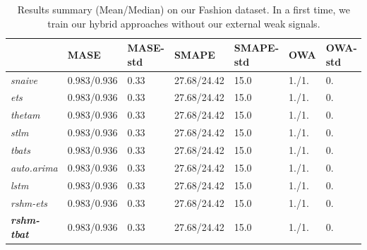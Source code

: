 \documentclass{article} %
\begin{document}
\begin{table}
  \caption{Results summary (Mean/Median) on our Fashion dataset. In a first time, we train our hybrid approaches without our external weak signals.}
  \label{sample-table}
  \centering
  \begin{tabular}{lllllll}
    \hline
    &  MASE  & MASE-std & SMAPE & SMAPE-std & OWA & OWA-std  \\
    \hline
     \textit{snaive} & 0.983/0.936 & 0.33 & 27.68/24.42 & 15.0 & 1./1. & 0.\\
     \textit{ets} & 0.983/0.936 & 0.33 & 27.68/24.42 & 15.0 & 1./1. & 0.\\
     \textit{thetam} & 0.983/0.936 & 0.33 & 27.68/24.42 & 15.0 & 1./1. & 0.\\
     \textit{stlm} & 0.983/0.936 & 0.33 & 27.68/24.42 & 15.0 & 1./1. & 0.\\
     \textit{tbats} & 0.983/0.936 & 0.33 & 27.68/24.42 & 15.0 & 1./1. & 0.\\
     \textit{auto.arima} & 0.983/0.936 & 0.33 & 27.68/24.42 & 15.0 & 1./1. & 0.\\
     \textit{lstm} & 0.983/0.936 & 0.33 & 27.68/24.42 & 15.0 & 1./1. & 0.\\
     \textit{rshm-ets} & 0.983/0.936 & 0.33 & 27.68/24.42 & 15.0 & 1./1. & 0.\\
     \textit{\textbf{rshm-tbat}} & 0.983/0.936 & 0.33 & 27.68/24.42 & 15.0 & 1./1. & 0.\\
    \hline
  \end{tabular}
\end{table}





\end{document}
